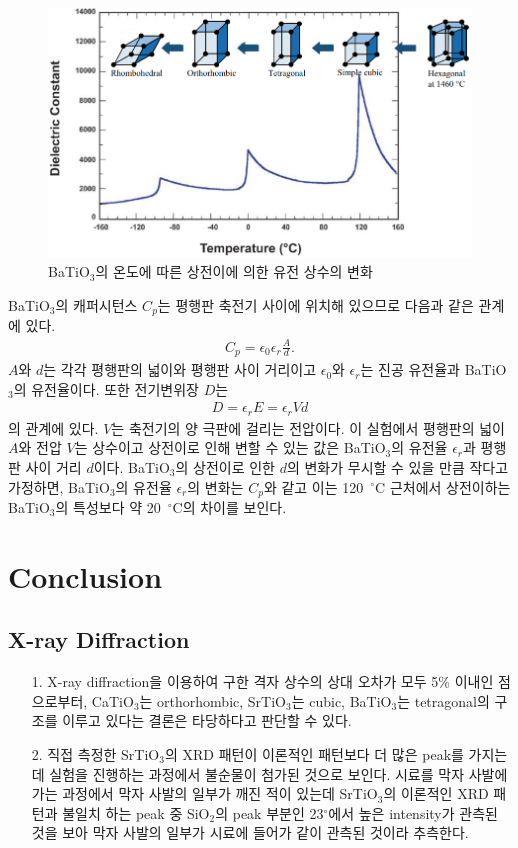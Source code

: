 \documentclass[aps,reprint,superscriptaddress,10pt]{revtex4-2}
\begin{document}
\begin{figure}[h!]
  \centering
  \includegraphics[scale=0.2]{capa.png}
  \caption{BaTiO$_3$의 온도에 따른 상전이에 의한 유전 상수의 변화}
  \label{fig:capa}
\end{figure}
BaTiO$_3$의 캐퍼시턴스 $C_p$는 평행판 축전기 사이에 위치해 있으므로 다음과 같은 관계에 있다.
\begin{align}
  C_p = \epsilon_0 \epsilon_r\frac{A}{d}.
\end{align}
$A$와 $d$는 각각 평행판의 넓이와 평행판 사이 거리이고 $\epsilon_0$와 $\epsilon_r$는
진공 유전율과 BaTiO$_3$의 유전율이다.
또한 전기변위장 $D$는
\begin{align}
  D = \epsilon_r E = \epsilon_r Vd
\end{align}
의 관계에 있다. $V$는 축전기의 양 극판에 걸리는 전압이다. 이 실험에서 평행판의 넓이 $A$와
전압 $V$는 상수이고 상전이로 인해 변할 수 있는 값은 BaTiO$_3$의 유전율 $\epsilon_r$과
평행판 사이 거리 $d$이다. BaTiO$_3$의 상전이로 인한 $d$의 변화가 무시할 수 있을 만큼 작다고
가정하면, BaTiO$_3$의 유전율 $\epsilon_r$의 변화는 $C_p$와 같고 이는 120~$^\circ$C 근처에서
상전이하는 BaTiO$_3$의 특성보다 약 20~$^\circ$C의 차이를 보인다.

\section{Conclusion}
\subsection{X-ray Diffraction}
\begin{itemize}
  \item[1. ] X-ray diffraction을 이용하여 구한 격자 상수의 상대 오차가 모두 5\% 이내인
  점으로부터, CaTiO$_3$는 orthorhombic, SrTiO$_3$는 cubic, BaTiO$_3$는 tetragonal의 
  구조를 이루고 있다는 결론은 타당하다고 판단할 수 있다.
  \item[2. ] 직접 측정한 SrTiO$_3$의 XRD 패턴이 이론적인 패턴보다 더 많은 peak를 가지는데
  실험을 진행하는 과정에서 불순물이 첨가된 것으로 보인다. 시료를 막자 사발에 가는 과정에서
  막자 사발의 일부가 깨진 적이 있는데 SrTiO$_3$의 이론적인 XRD 패턴과 불일치 하는 peak 중
  SiO$_2$의 peak 부분인 23$^\circ$에서 높은 intensity가 관측된 것을 보아 막자 사발의 일부가
  시료에 들어가 같이 관측된 것이라 추측한다.

\end{itemize}
\end{document}
